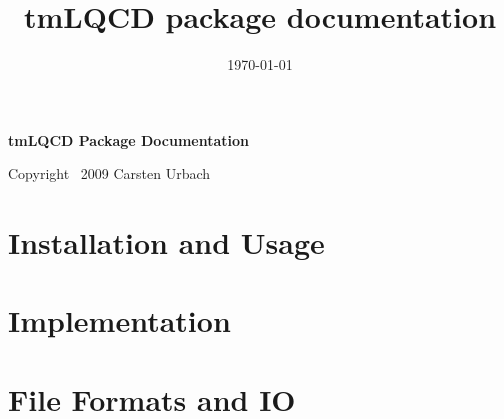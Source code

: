 \documentclass[a4paper,12pt,dvips]{article}
\date{\today}
\title{tmLQCD package documentation}
\begin{document}
\begin{center}
  {\Large\bf tmLQCD Package Documentation}\\
\end{center}

\tableofcontents

\begin{flushright}
  Copyright \textcopyright\ 2009 Carsten Urbach
\end{flushright}

\section{Installation and Usage}


\section{Implementation}



\section{File Formats and IO}



\end{document}
